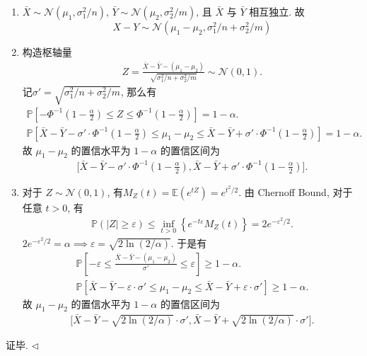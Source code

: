 \documentclass[11pt]{article}
\newenvironment{answer}[1][Solution]{\begin{trivlist}
    \item[\hskip \labelsep {\bfseries #1.}\hskip \labelsep]}{\hfill$\lhd$\end{trivlist}}
\newcommand\1{\mathds{1}}
\newcommand\E{\mathbb{E}}
\newcommand\PP{\mathbb{P}}
\begin{document}
\begin{answer}
    \begin{enumerate}[label = (\arabic*)]
        \item $\bar{X} \sim \mathcal{N}(\mu_1, \sigma_1^2/n)$, $\bar{Y} \sim \mathcal{N}(\mu_2, \sigma_2^2/m)$, 且 $\bar{X}$ 与 $\bar{Y}$ 相互独立. 故 
        \[
            X - Y \sim \mathcal{N}(\mu_1 - \mu_2, \sigma_1^2/n + \sigma_2^2/m)
        \]
        \item 构造枢轴量
        \begin{align*}
            Z = \frac{\bar{X} - \bar{Y} - (\mu_1 - \mu_2)}{\sqrt{\sigma_1^2/n + \sigma_2^2/m}} \sim \mathcal{N}(0, 1).
        \end{align*}
        记$\sigma' = \sqrt{\sigma_1^2/n + \sigma_2^2/m}$, 那么有
        \begin{gather*}
            \PP\left[-\Phi^{-1}\left(1-\frac{\alpha}{2}\right) \le Z \le \Phi^{-1}\left(1-\frac{\alpha}{2}\right)\right] = 1 - \alpha. \\
            \PP\left[\bar{X} - \bar{Y} - \sigma'\cdot \Phi^{-1}\left(1-\frac{\alpha}{2}\right) \le \mu_1 - \mu_2 \le \bar{X} - \bar{Y} + \sigma' \cdot \Phi^{-1}\left(1-\frac{\alpha}{2}\right)\right] = 1 - \alpha.
        \end{gather*}
        故 $\mu_1 - \mu_2$ 的置信水平为 $1-\alpha$ 的置信区间为
        \begin{align*}
            \bigg[\bar{X} - \bar{Y} - \sigma' \cdot \Phi^{-1}\left(1-\frac{\alpha}{2}\right), \bar{X} - \bar{Y} + \sigma' \cdot \Phi^{-1}\left(1-\frac{\alpha}{2}\right)\bigg].
        \end{align*}
        \item 对于 $Z \sim \mathcal{N}(0,1)$, 有$M_Z(t) = \E(e^{tZ}) = e^{t^2/2}$. 由 Chernoff Bound, 对于任意 $t > 0$, 有
        \begin{align*}
            \PP(|Z| \ge \varepsilon) \le \inf_{t > 0} \left\{e^{-t\varepsilon}M_Z(t)\right\} = 2e^{-\varepsilon^2/2}.
        \end{align*}
        $2e^{-\varepsilon^2/2} = \alpha \implies \varepsilon = \sqrt{2\ln(2/\alpha)}$. 于是有
        \begin{gather*}
            \PP\left[-\varepsilon \le \frac{\bar{X}-\bar{Y}-(\mu_1-\mu_2)}{\sigma'} \le \varepsilon\right] \ge 1 - \alpha. \\
            \PP\left[\bar{X} - \bar{Y} - \varepsilon \cdot \sigma' \le \mu_1 - \mu_2 \le \bar{X} - \bar{Y} + \varepsilon \cdot \sigma'\right] \ge 1 - \alpha.
        \end{gather*}
        故 $\mu_1 - \mu_2$ 的置信水平为 $1-\alpha$ 的置信区间为
        \begin{align*}
            \bigg[\bar{X} - \bar{Y} - \sqrt{2\ln(2/\alpha)} \cdot \sigma', \bar{X} - \bar{Y} + \sqrt{2\ln(2/\alpha)} \cdot \sigma'\bigg].
        \end{align*}
    \end{enumerate}
    证毕.
\end{answer}
\end{document}
